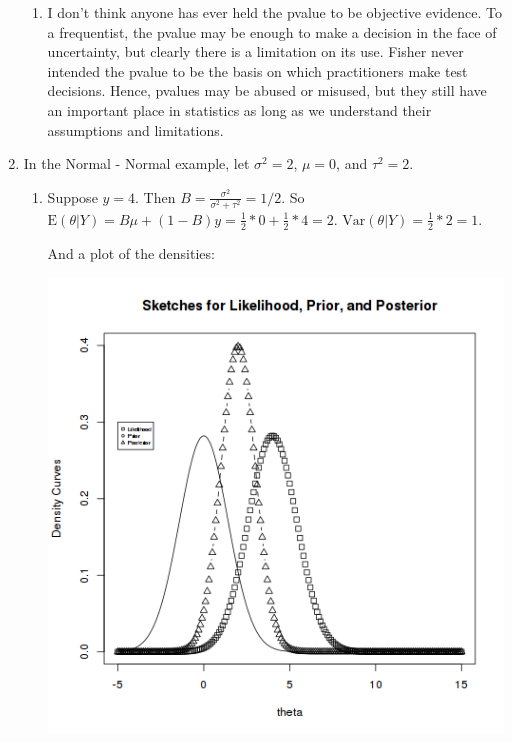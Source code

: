 \documentclass[12pt]{article}
\begin{document}
\begin{flushleft}
\begin{enumerate}
\begin{enumerate}
\item I don't think anyone has ever held the pvalue to be objective evidence. To a frequentist, the pvalue may be enough to make a decision in the face of uncertainty, but clearly there is a limitation on its use. Fisher never intended the pvalue to be the basis on which practitioners make test decisions. Hence, pvalues may be abused or misused, but they still have an important place in statistics as long as we understand their assumptions and limitations.

\end{enumerate}

\item  In the Normal - Normal example, let $\sigma^2 = 2$, $\mu = 0$, and $\tau^2 = 2$.

\begin{enumerate}

\item  Suppose $y=4$. Then $B = \frac{\sigma^2}{\sigma^2 + \tau^2} = 1/2$. So $\mathrm{E}(\theta | Y) = B\mu + (1-B)y = \frac{1}{2} * 0 + \frac{1}{2}*4 = 2$. $\mathrm{Var}(\theta | Y ) = \frac{1}{2} * 2 = 1$. 

And a plot of the densities:

\begin{center}
\includegraphics[scale=0.6]{plot1.png}
\end{center}


\end{enumerate}
\end{enumerate}
\end{flushleft}
\end{document}
